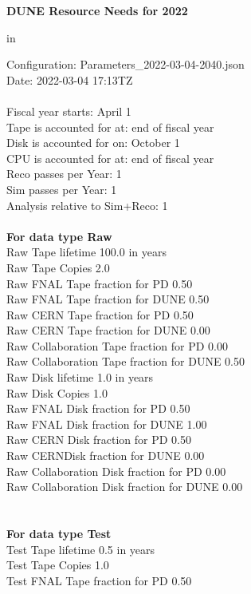 \documentclass[12pt]{article}
\begin{document}
\centerline{\bf{DUNE Resource Needs for 2022}} in \par Configuration: Parameters\_2022-03-04-2040.json\\
  Date: 2022-03-04 17:13TZ\\
   \\
  
 Fiscal year starts: April 1\\ 
Tape is accounted for at: end of fiscal year\\ 
Disk is accounted for on: October 1\\ 
CPU is accounted for at: end of fiscal year\\ 
Reco passes per Year: 1\\
Sim passes per Year: 1\\
Analysis relative to Sim+Reco: 1\\
\pagebreak
\\
{\bf For data type Raw}\\
   Raw Tape lifetime 100.0 in years\\
   Raw Tape Copies   2.0\\
   Raw FNAL Tape fraction for PD  0.50\\
   Raw FNAL Tape fraction for DUNE  0.50\\
   Raw CERN Tape fraction for PD  0.50\\
   Raw CERN Tape fraction for DUNE  0.00\\
   Raw Collaboration Tape fraction for PD  0.00\\
   Raw Collaboration Tape fraction for DUNE  0.50\\
   Raw Disk lifetime   1.0 in years\\
   Raw Disk Copies   1.0\\
   Raw FNAL Disk fraction for PD  0.50\\
   Raw FNAL Disk fraction for DUNE  1.00\\
   Raw CERN Disk fraction for PD  0.50\\
   Raw CERNDisk fraction for DUNE  0.00\\
   Raw Collaboration Disk fraction for PD  0.00\\
   Raw Collaboration Disk fraction for DUNE  0.00\\
\pagebreak\\
\\
{\bf For data type Test}\\
  Test Tape lifetime   0.5 in years\\
  Test Tape Copies   1.0\\
  Test FNAL Tape fraction for PD  0.50\\
\end{document}
